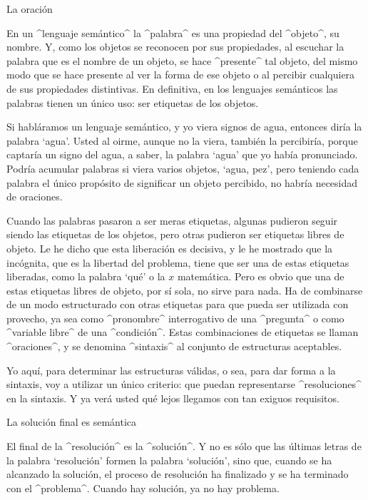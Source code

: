 

\Section La oración

En un ^lenguaje semántico^ la ^palabra^ es una propiedad del ^objeto^,
su nombre. Y, como los objetos se reconocen por sus propiedades, al
escuchar la palabra que es el nombre de un objeto, se hace ^presente^
tal objeto, del mismo modo que se hace presente al ver la forma de ese
objeto o al percibir cualquiera de sus propiedades distintivas. En
definitiva, en los lenguajes semánticos las palabras tienen un único
uso: ser etiquetas de los objetos.

Si habláramos un lenguaje semántico, y yo viera signos de agua, entonces
diría la palabra `agua'. Usted al oirme, aunque no la viera, también la
percibiría, porque captaría un signo del agua, a saber, la palabra
`agua' que yo había pronunciado. Podría acumular palabras si viera
varios objetos, `agua, pez', pero teniendo cada palabra el único
propósito de significar un objeto percibido, no habría necesidad de
oraciones.

Cuando las palabras pasaron a ser meras etiquetas, algunas pudieron
seguir siendo las etiquetas de los objetos, pero otras pudieron ser
etiquetas libres de objeto. Le he dicho que esta liberación es decisiva,
y le he mostrado que la incógnita, que es la libertad del problema,
tiene que ser una de estas etiquetas liberadas, como la palabra `qué' o
la $x$ matemática. Pero es obvio que una de estas etiquetas libres de
objeto, por sí sola, no sirve para nada. Ha de combinarse de un modo
estructurado con otras etiquetas para que pueda ser utilizada con
provecho, ya sea como ^pronombre^ interrogativo de una ^pregunta^ o como
^variable libre^ de una ^condición^. Estas combinaciones de etiquetas se
llaman ^oraciones^, y se denomina ^sintaxis^ al conjunto de estructuras
aceptables.

Yo aquí, para determinar las estructuras válidas, o sea, para dar forma
a la sintaxis, voy a utilizar un único criterio: que puedan
representarse ^resoluciones^ en la sintaxis. Y ya verá usted qué lejos
llegamos con tan exiguos requisitos.


\Section La solución final es semántica

El final de la ^resolución^ es la ^solución^. Y no es sólo que las
últimas letras de la palabra `resolución' formen la palabra `solución',
sino que, cuando se ha alcanzado la solución, el proceso de resolución
ha finalizado y se ha terminado con el ^problema^. Cuando hay solución,
ya no hay problema.

